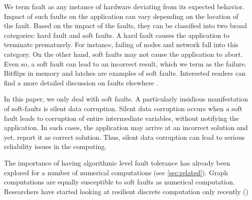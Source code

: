 
We term fault as any instance of hardware deviating from its expected
behavior. Impact of such faults on the application can vary  depending on the
location of the fault. Based on the impact of the faults, they can be
classified into two broad categories: hard fault and soft faults. A hard fault
causes the application to terminate prematurely. For instance, failing of nodes and network fall
into this category. On the other hand, soft faults may not cause the
application to abort. Even so, a soft fault can lead to an incorrect result,
which we term as the failure. Bitflips in memory and latches are examples of
soft faults. Interested readers can find a more detailed discussion on faults
elsewhere  \cite{hoemmen2011ftgmres}.

In this paper, we only deal with soft faults. A particularly insidious
manifestation of soft-faults is silent data corruption. Silent data corruption
occurs when a soft fault leads to corruption of entire intermediate variables,
without notifying the application. In such cases, the application may arrive
at an incorrect solution and yet, report it as correct solution. Thus, silent
data corruption can lead to serious reliability issues in the computing. 


The importance of having algorithmic level fault tolerance has already been
explored for a number of numerical computations (see \cref{sec:related}). Graph
computations are equally susceptible to soft faults as numerical computation.
Researchers have started looking at resilient discrete computation only
recently ()

